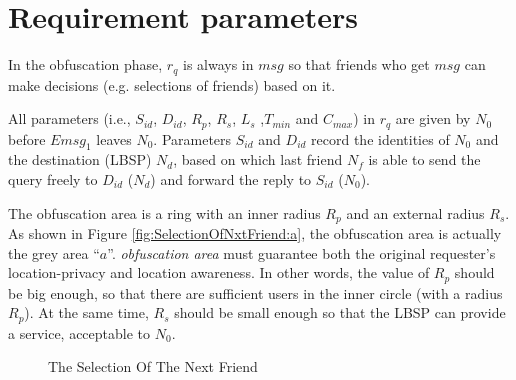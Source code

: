 \section{ Requirement parameters} \label{SecReqPara}

\noindent In the obfuscation phase, ${r}_{q}$ is always in $msg$ so that friends who get $msg$ can make decisions (e.g. selections of friends) based on it.

All parameters (i.e., ${S}_{id}$, ${D}_{id}$, ${R}_{p}$, ${R}_{s}$, ${L}_{s}$ ,${T}_{min}$ and ${C}_{max}$) in ${r}_{q}$ are given by ${N}_{0}$ before ${Emsg}_{1}$ leaves ${N}_{0}$. Parameters ${S}_{id}$ and ${D}_{id}$ record the identities of ${N}_{0}$ and the destination (LBSP) ${N}_{d}$, based on which last friend ${N}_{f}$ is able to send the query freely to ${D}_{id}$ (${N}_{d}$) and forward the reply to ${S}_{id}$ (${N}_{0}$).

The obfuscation area is a ring with an inner radius ${R}_{p}$ and an external radius ${R}_{s}$. As shown in Figure \ref{fig:SelectionOfNxtFriend:a}, the obfuscation area is actually the grey area ``$a$''. \textit{obfuscation area} must guarantee both the original requester's location-privacy and location awareness. In other words, the value of ${R}_{p}$ should be big enough, so that there are sufficient users in the inner circle (with a radius ${R}_{p}$). At the same time, ${R}_{s}$ should be small enough so that the LBSP can provide a service, acceptable to ${N}_{0}$. 


\begin{figure} [H]
  \centering 
  \caption{The Selection Of The Next Friend} 
  \label{fig:SelectionOfNxtFriend} %
\end{figure}

